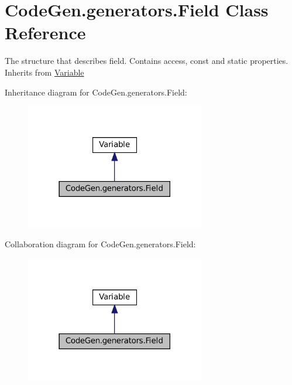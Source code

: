 \hypertarget{classCodeGen_1_1generators_1_1Field}{}\section{Code\+Gen.\+generators.\+Field Class Reference}
\label{classCodeGen_1_1generators_1_1Field}


The structure that describes field. Contains access, const and static properties. Inherits from \mbox{\hyperlink{classCodeGen_1_1generators_1_1Variable}{Variable}}  




Inheritance diagram for Code\+Gen.\+generators.\+Field\+:
\nopagebreak
\begin{figure}[H]
\begin{center}
\leavevmode
\includegraphics[width=222pt]{classCodeGen_1_1generators_1_1Field__inherit__graph}
\end{center}
\end{figure}


Collaboration diagram for Code\+Gen.\+generators.\+Field\+:
\nopagebreak
\begin{figure}[H]
\begin{center}
\leavevmode
\includegraphics[width=222pt]{classCodeGen_1_1generators_1_1Field__coll__graph}
\end{center}
\end{figure}
